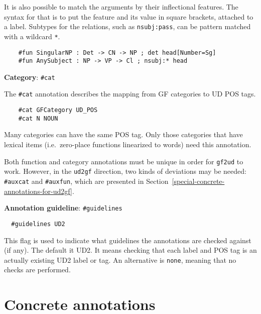 It is also possible to match the arguments by their inflectional features. The syntax for that is to put the feature and its value in square brackets, attached to a label. Subtypes for the relations, such as \texttt{nsubj:pass}, can be pattern matched with a wildcard \verb|*|.

\begin{lstlisting}
    #fun SingularNP : Det -> CN -> NP ; det head[Number=Sg]
    #fun AnySubject : NP -> VP -> Cl ; nsubj:* head
\end{lstlisting}


\textbf{Category}: \texttt{\#cat}

The \lstinline{#cat} annotation describes the mapping from GF categories to UD POS tags.

\begin{lstlisting}
    #cat GFCategory UD_POS
    #cat N NOUN
\end{lstlisting}

Many categories can have the same POS tag. Only those categories that
have lexical items (i.e.~zero-place functions linearized to words) need
this annotation.

Both function and category annotations must be unique in order for
\texttt{gf2ud} to work. 
However, in the \texttt{ud2gf} direction, two kinds of deviations may be needed: \texttt{\#auxcat} and \texttt{\#auxfun}, which are presented in Section~\ref{special-concrete-annotations-for-ud2gf}.



\textbf{Annotation guideline}: \texttt{\#guidelines}

\begin{verbatim}
  #guidelines UD2
\end{verbatim}


This flag is used to indicate what guidelines the annotations are
checked against (if any). The default it UD2. It means checking that
each label and POS tag is an actually existing UD2 label or tag. An
alternative is \texttt{none}, meaning that no checks are performed.



\hypertarget{concrete-annotations}{%
\section{Concrete annotations}\label{concrete-annotations}}

